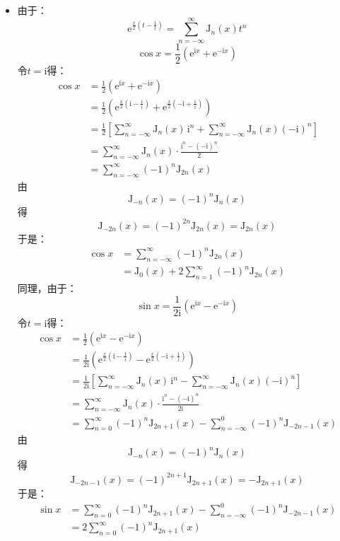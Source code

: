 \documentclass[fontset=windows]{ctexart}
\begin{document}
\begin{itemize}
    \item[2.(1)]
    由于：
    \[
    \mathrm{e}^{\tfrac{x}{2}\left(t-\tfrac{1}{t}\right)} = \sum_{n=-\infty}^{\infty}\mathrm{J}_n(x)t^n
    \]
    \[
    \cos{x} = \frac{1}{2}(\mathrm{e}^{\mathrm{i}x} + \mathrm{e}^{-\mathrm{i}x})
    \]
    令$t = \mathrm{i}$得：
    \begin{align*}
    \cos{x}
    &= \frac{1}{2}(\mathrm{e}^{\mathrm{i}x} + \mathrm{e}^{-\mathrm{i}x}) \\
    &= \frac{1}{2}(\mathrm{e}^{\tfrac{x}{2}\left(\mathrm{i}-\tfrac{1}{\mathrm{i}}\right)} + \mathrm{e}^{\tfrac{x}{2}\left(-\mathrm{i}+\tfrac{1}{\mathrm{i}}\right)}) \\
    &= \frac{1}{2}\left[\sum_{n=-\infty}^{\infty}\mathrm{J}_n(x)\,\mathrm{i}^n + \sum_{n=-\infty}^{\infty}\mathrm{J}_n(x)(-\mathrm{i})^n\right] \\
    &= \sum_{n=-\infty}^{\infty}\mathrm{J}_n(x)\cdot\frac{\mathrm{i}^n - (-\mathrm{i})^n}{2} \\
    &= \sum_{n=-\infty}^{\infty}(-1)^n \mathrm{J}_{2n}(x)
    \end{align*}
    由
    \[
    \mathrm{J}_{-n}(x) = (-1)^n \mathrm{J}_n(x)
    \]
    得
    \[
    \mathrm{J}_{-2n}(x) = (-1)^{2n}\mathrm{J}_{2n}(x) = \mathrm{J}_{2n}(x)
    \]
    于是：
    \begin{align*}
    \cos{x}
    &= \sum_{n=-\infty}^{\infty}(-1)^n \mathrm{J}_{2n}(x) \\
    &= \mathrm{J}_0(x) + 2\sum_{n=1}^{\infty}(-1)^n \mathrm{J}_{2n}(x)
    \end{align*}
    同理，由于：
    \[
    \sin{x} = \frac{1}{2\mathrm{i}}(\mathrm{e}^{\mathrm{i}x} - \mathrm{e}^{-\mathrm{i}x})
    \]
    令$t = \mathrm{i}$得：
    \begin{align*}
    \cos{x}
    &= \frac{1}{2}(\mathrm{e}^{\mathrm{i}x} - \mathrm{e}^{-\mathrm{i}x}) \\
    &= \frac{1}{2\mathrm{i}}(\mathrm{e}^{\tfrac{x}{2}\left(\mathrm{i}-\tfrac{1}{\mathrm{i}}\right)} - \mathrm{e}^{\tfrac{x}{2}\left(-\mathrm{i}+\tfrac{1}{\mathrm{i}}\right)}) \\
    &= \frac{1}{2\mathrm{i}}\left[\sum_{n=-\infty}^{\infty}\mathrm{J}_n(x)\,\mathrm{i}^n - \sum_{n=-\infty}^{\infty}\mathrm{J}_n(x)(-\mathrm{i})^n\right] \\
    &= \sum_{n=-\infty}^{\infty}\mathrm{J}_n(x)\cdot\frac{\mathrm{i}^n - (-\mathrm{i})^n}{2\mathrm{i}} \\
    &= \sum_{n=0}^{\infty}(-1)^n \mathrm{J}_{2n+1}(x) - \sum_{n=-\infty}^{0}(-1)^n \mathrm{J}_{-2n-1}(x)
    \end{align*}
    由
    \[
    \mathrm{J}_{-n}(x) = (-1)^n \mathrm{J}_n(x)
    \]
    得
    \[
    \mathrm{J}_{-2n-1}(x) = (-1)^{2n+1}\mathrm{J}_{2n+1}(x) = -\mathrm{J}_{2n+1}(x)
    \]
    于是：
    \begin{align*}
    \sin{x}
    &= \sum_{n=0}^{\infty}(-1)^n \mathrm{J}_{2n+1}(x) - \sum_{n=-\infty}^{0}(-1)^n \mathrm{J}_{-2n-1}(x) \\
    &= 2\sum_{n=0}^{\infty}(-1)^n \mathrm{J}_{2n+1}(x)
    \end{align*}
    \medskip


\end{itemize}
\end{document}
